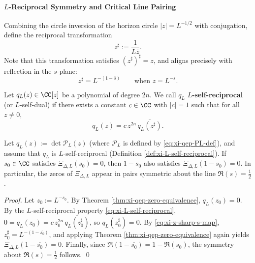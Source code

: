 \paragraph{\texorpdfstring{$L$}{L}-Reciprocal Symmetry and Critical Line Pairing}
Combining the circle inversion of the horizon circle \(|z|=L^{-1/2}\) with conjugation, define the reciprocal transformation
\begin{equation}\label{eq:xi-z-sharp}
z^\sharp:=\frac{1}{L\overline{z}}.
\end{equation}
Note that this transformation satisfies \((z^\sharp)^\sharp=z\), and aligns precisely with reflection in the \(s\)-plane:
\begin{equation}\label{eq:xi-z-sharp-s-map}
z^\sharp=L^{-(1-\overline{s})}\qquad\text{when }z=L^{-s}.
\end{equation}

\begin{definition}\label{def:xi-L-self-reciprocal}
Let \(q_L(z)\in\CC[z]\) be a polynomial of degree \(2n\).
We call \(q_L\) \textbf{\(L\)-self-reciprocal} (or \(L\)-self-dual) if there exists a constant \(c\in\CC\) with \(|c|=1\) such that for all \(z\neq 0\),
\begin{equation}\label{eq:xi-L-self-reciprocal}
q_L(z)=c\,z^{2n}\,\overline{q_L(z^\sharp)}.
\end{equation}
\end{definition}

\begin{theorem}\label{thm:xi-L-reciprocal-implies-critical-pairing}
Let \(q_L(z):=\det \mathcal{P}_L(z)\) (where \(\mathcal{P}_L\) is defined by \eqref{eq:xi-qep-PL-def}), and assume that \(q_L\) is \(L\)-self-reciprocal (Definition \ref{def:xi-L-self-reciprocal}).
If \(s_0\in\CC\) satisfies \(\Xi_{\Delta,L}(s_0)=0\), then \(1-\overline{s_0}\) also satisfies \(\Xi_{\Delta,L}(1-\overline{s_0})=0\).
In particular, the zeros of \(\Xi_{\Delta,L}\) appear in pairs symmetric about the line \(\Re(s)=\tfrac12\).
\end{theorem}

\begin{proof}
Let \(z_0:=L^{-s_0}\). By Theorem \ref{thm:xi-qep-zero-equivalence}, \(q_L(z_0)=0\).
By the \(L\)-self-reciprocal property \eqref{eq:xi-L-self-reciprocal},
\(
0=q_L(z_0)=c\,z_0^{2n}\,\overline{q_L(z_0^\sharp)}
\), so \(q_L(z_0^\sharp)=0\).
By \eqref{eq:xi-z-sharp-s-map}, \(z_0^\sharp=L^{-(1-\overline{s_0})}\), and applying Theorem \ref{thm:xi-qep-zero-equivalence} again yields \(\Xi_{\Delta,L}(1-\overline{s_0})=0\).
Finally, since \(\Re(1-\overline{s_0})=1-\Re(s_0)\), the symmetry about \(\Re(s)=\tfrac12\) follows. \qed
\end{proof}

